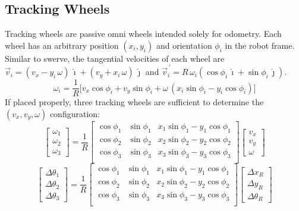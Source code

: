 \documentclass{article}
\newcommand{\pvec}[1]{\vec{#1}^{\,\prime}}
\begin{document}
\subsection{Tracking Wheels}
Tracking wheels are passive omni wheels intended solely for odometry. Each wheel has an arbitrary position $(x_i, y_i)$ and orientation $\phi_i$ in the robot frame. Similar to swerve, the tangential velocities of each wheel are $\vec{v}_i = (v_x - y_i \, \omega) \, \hat{\imath} + (v_y + x_i \, \omega) \, \hat{\jmath}$ and $\pvec{v}_i = R \, \omega_i (\operatorname{cos} \phi_i \, \hat{\imath} + \operatorname{sin} \phi_i \, \hat{\jmath})$. 
$$
    \omega_i = \frac{1}{R}\Big[v_x \operatorname{cos} \phi_i + v_y \operatorname{sin} \phi_i + \omega \, (x_i \operatorname{sin} \phi_i - y_i \operatorname{cos} \phi_i)\Big]
$$
If placed properly, three tracking wheels are sufficient to determine the $(v_x, v_y, \omega)$ configuration:
$$
\begin{bmatrix}
    \omega_1\\
    \omega_2\\
    \omega_3
\end{bmatrix}
=
\frac{1}{R}
\begin{bmatrix}
    \operatorname{cos} \phi_1 & \operatorname{sin} \phi_1 & x_1 \operatorname{sin} \phi_1 - y_1 \operatorname{cos} \phi_1 \\
    \operatorname{cos} \phi_2 & \operatorname{sin} \phi_2 & x_2 \operatorname{sin} \phi_2 - y_2 \operatorname{cos} \phi_2 \\
    \operatorname{cos} \phi_3 & \operatorname{sin} \phi_3 & x_3 \operatorname{sin} \phi_3 - y_3 \operatorname{cos} \phi_3 \\
\end{bmatrix}
\begin{bmatrix}
    v_x\\
    v_y\\
    \omega
\end{bmatrix}
$$
$$
\begin{bmatrix}
    \Delta \theta_1\\
    \Delta \theta_2\\
    \Delta \theta_3
\end{bmatrix}
=
\frac{1}{R}
\begin{bmatrix}
    \operatorname{cos} \phi_1 & \operatorname{sin} \phi_1 & x_1 \operatorname{sin} \phi_1 - y_1 \operatorname{cos} \phi_1 \\
    \operatorname{cos} \phi_2 & \operatorname{sin} \phi_2 & x_2 \operatorname{sin} \phi_2 - y_2 \operatorname{cos} \phi_2 \\
    \operatorname{cos} \phi_3 & \operatorname{sin} \phi_3 & x_3 \operatorname{sin} \phi_3 - y_3 \operatorname{cos} \phi_3 \\
\end{bmatrix}
\begin{bmatrix}
    \Delta x_R\\
    \Delta y_R\\
    \Delta \theta_R
\end{bmatrix}
$$
\end{document}
